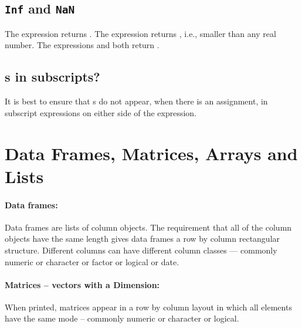 \subsection*{\texttt{Inf} and \texttt{NaN}}

The expression  returns .
The expression  returns ,
i.e., smaller than any real number. The expressions  and
 both return .

\subsection*{s in subscripts?}

It is best to ensure that s do not appear, when there
is an assignment, in subscript expressions on either side of the
expression.

\section{Data Frames, Matrices, Arrays and Lists}\label{sec:dframes}

\paragraph{Data frames:} Data frames are lists of column objects.
The requirement that all
of the column objects have the same length gives data frames a row
by column rectangular structure.  Different columns can have different
column classes --- commonly numeric or character or factor or logical
or date.

\paragraph{Matrices -- vectors with a Dimension:}
When printed, matrices appear in a row by column layout in which all
elements have the same mode -- commonly numeric or character or
logical.

